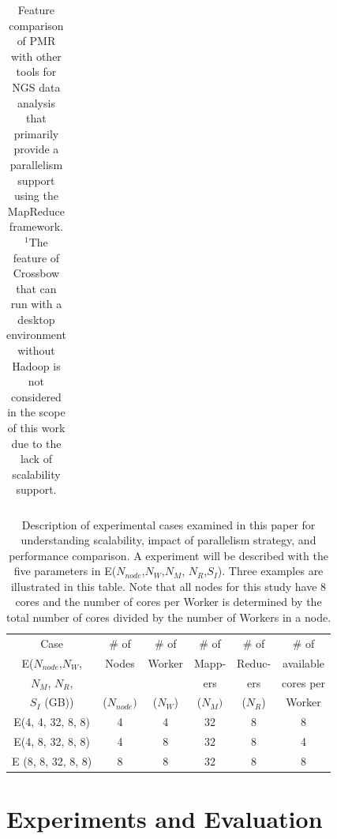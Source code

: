 \documentclass{acm_proc_article-sp}
\begin{document}
\begin{center}
\begin{table}[ht]
{\begin{tabular}{|l|l|c|c|c|c|c|c|}
\hline
\end{tabular}}
\hfill{}
\caption{Feature comparison of PMR with other tools for NGS data analysis that primarily provide a parallelism support using the MapReduce framework.  $^{1}${The feature of Crossbow that can run with a desktop environment without Hadoop is not considered in the scope of this work due to the lack of scalability support.} }
 \label{table:mr-comparison}
\end{table}
\end{center}


\begin{table}
\small
 \begin{tabular}{|c|c|c|c|c|c|} 
 \hline 

Case & \# of  & \# of &  \# of & \# of & \# of  \\
E($N_{node}$,$N_W$,  & Nodes & Worker   & Mapp- & Reduc- & available  \\
$N_M$, $N_R$,  & &  & ers & ers & cores per\\
$S_I$ (GB)) & ($N_{node})$& ($N_W$) & ($N_M) $ & ($N_R$) & Worker \\
 \hline
E(4, 4, 32, 8, 8) &4 &  4 & 32  & 8 & 8 \\
E(4, 8, 32, 8, 8) & 4 & 8 & 32 & 8 & 4 \\
E (8, 8, 32, 8, 8) & 8 & 8 & 32 & 8 & 8 \\ 
 \hline
 \end{tabular}

 \caption{Description of experimental cases examined in this paper for understanding scalability, impact of parallelism strategy, and performance comparison.  A experiment will be described with the five parameters in E($N_{node}$,$N_W$,$N_M$, $N_R$,$S_I$).  Three examples are illustrated in this table.  Note that all nodes for this study have 8 cores and the number of cores per Worker is determined by the total number of cores divided by the number of Workers in a node.}
    \label{table:exp-description} 
\end{table}

\section{Experiments and Evaluation}\label{sec:results}
\end{document}
